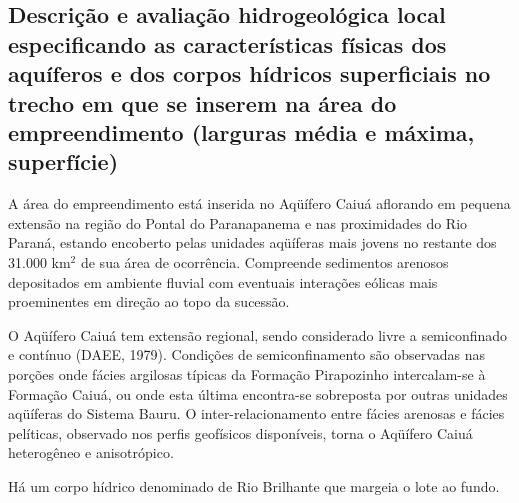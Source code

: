 \subsection{Descrição e avaliação hidrogeológica local especificando as características físicas dos aquíferos e dos corpos hídricos superficiais no trecho em que se inserem na área do empreendimento (larguras média e máxima, superfície)}

A  área do empreendimento está inserida no Aqüífero Caiuá aflorando em pequena extensão na região do Pontal do Paranapanema e nas proximidades do Rio Paraná, estando encoberto pelas unidades aqüíferas mais jovens no restante dos 31.000 km$^2$ de sua área de ocorrência. Compreende sedimentos arenosos depositados em ambiente fluvial com eventuais interações eólicas mais proeminentes em direção ao topo da sucessão.

O Aqüífero Caiuá tem extensão regional, sendo considerado livre a semiconfinado e contínuo (DAEE, 1979). Condições de semiconfinamento são observadas nas porções onde fácies argilosas típicas da Formação Pirapozinho intercalam-se à Formação Caiuá, ou onde esta última encontra-se sobreposta por outras unidades aqüíferas do Sistema Bauru. O inter-relacionamento entre fácies arenosas e fácies pelíticas, observado nos perfis geofísicos disponíveis, torna o Aqüífero Caiuá heterogêneo e anisotrópico.


Há um corpo hídrico denominado de Rio Brilhante que margeia o lote ao fundo.